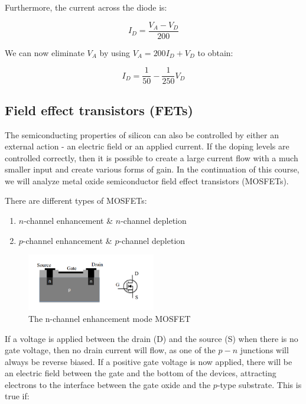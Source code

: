 \documentclass{article}
\begin{document}
Furthermore, the current across the diode is:

\[ I_D = \frac{V_A - V_D}{200} \]

We can now eliminate $V_A$ by using $V_A = 200I_D + V_D$ to obtain:

\[ I_D = \frac{1}{50} - \frac{1}{250}V_D \]

\newpage

\subsection{Field effect transistors (FETs)}

The semiconducting properties of silicon can also be controlled by either an external action - an electric field or an applied current. If the doping levels are controlled correctly, then it is possible to create a large current flow with a much smaller input and create various forms of gain. In the continuation of this course, we will analyze metal oxide semiconductor field effect transistors (MOSFETs).

There are different types of MOSFETs:

\begin{enumerate}
    \item $n$-channel enhancement \& $n$-channel depletion
    \item $p$-channel enhancement \& $p$-channel depletion
\end{enumerate}

\begin{figure}[h]
    \centering
    \includegraphics[width = 0.5\textwidth]{images/fet1.png}
    \caption{The n-channel enhancement mode MOSFET}
    \label{fig:fet1}
\end{figure}

If a voltage is applied between the drain (D) and the source (S) when there is no gate voltage, then no drain current will flow, as one of the $p-n$ junctions will always be reverse biased. If a positive gate voltage is now applied, there will be an electric field between the gate and the bottom of the devices, attracting electrons to the interface between the gate oxide and the $p$-type substrate. This is true if:
\end{document}
